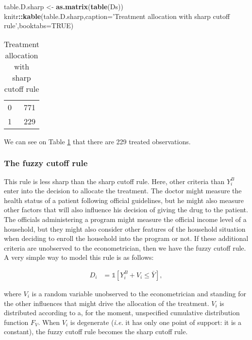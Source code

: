 \documentclass[]{book}
\newenvironment{Shaded}{\begin{snugshade}}{\end{snugshade}}
\newcommand{\KeywordTok}[1]{\textcolor[rgb]{0.13,0.29,0.53}{\textbf{#1}}}
\newcommand{\DataTypeTok}[1]{\textcolor[rgb]{0.13,0.29,0.53}{#1}}
\newcommand{\StringTok}[1]{\textcolor[rgb]{0.31,0.60,0.02}{#1}}
\newcommand{\OtherTok}[1]{\textcolor[rgb]{0.56,0.35,0.01}{#1}}
\newcommand{\OperatorTok}[1]{\textcolor[rgb]{0.81,0.36,0.00}{\textbf{#1}}}
\newcommand{\NormalTok}[1]{#1}
\newcommand{\uns}[1]{\mathds{1}[ #1 ]}
\theoremstyle{definition}
\theoremstyle{definition}
\theoremstyle{definition}
\theoremstyle{remark}
\begin{document}
\begin{Shaded}
\begin{Highlighting}[]
\NormalTok{table.D.sharp <-}\StringTok{ }\KeywordTok{as.matrix}\NormalTok{(}\KeywordTok{table}\NormalTok{(Ds))}
\NormalTok{knitr}\OperatorTok{::}\KeywordTok{kable}\NormalTok{(table.D.sharp,}\DataTypeTok{caption=}\StringTok{'Treatment allocation with sharp cutoff rule'}\NormalTok{,}\DataTypeTok{booktabs=}\OtherTok{TRUE}\NormalTok{)}
\end{Highlighting}
\end{Shaded}

\begin{table}[t]

\caption{\label{tab:tableDsharp}Treatment allocation with sharp cutoff rule}
\centering
\begin{tabular}{lr}
\toprule
0 & 771\\
1 & 229\\
\bottomrule
\end{tabular}
\end{table}

We can see on Table \ref{tab:tableDsharp} that there are 229 treated
observations.

\subsubsection{The fuzzy cutoff rule}\label{the-fuzzy-cutoff-rule}

This rule is less sharp than the sharp cutoff rule. Here, other criteria
than \(Y_i^B\) enter into the decision to allocate the treatment. The
doctor might measure the health status of a patient following official
guidelines, but he might also measure other factors that will also
influence his decision of giving the drug to the patient. The officials
administering a program might measure the official income level of a
household, but they might also consider other features of the household
situation when deciding to enroll the household into the program or not.
If these additional criteria are unobserved to the econometrician, then
we have the fuzzy cutoff rule. A very simple way to model this rule is
as follows:

\begin{align}\label{eq:fuzzcutoff}
  D_i & = \uns{Y_i^B+V_i\leq\bar{Y}},
\end{align}

where \(V_i\) is a random variable unobserved to the econometrician and
standing for the other influences that might drive the allocation of the
treatment. \(V_i\) is distributed according to a, for the moment,
unspecified cumulative distribution function \(F_V\). When \(V_i\) is
degenerate (\textit{i.e.} it has only one point of support: it is a
constant), the fuzzy cutoff rule becomes the sharp cutoff rule.
\end{document}
